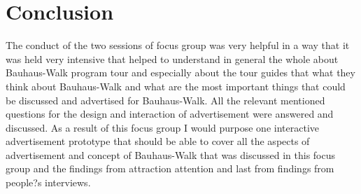 \section{Conclusion}
The conduct of the two sessions of focus group was very helpful in a way that it was held very intensive that helped to understand in general the whole about Bauhaus-Walk program tour and especially about the tour guides that what they think about Bauhaus-Walk and what are the most important things that could be discussed and advertised for Bauhaus-Walk. All the relevant mentioned questions for the design and interaction of advertisement were answered and discussed. As a result of this focus group I would purpose one interactive advertisement prototype that should be able to cover all the aspects of advertisement and concept of Bauhaus-Walk that was discussed in this focus group and the findings from attraction attention and last from findings from people?s interviews.




